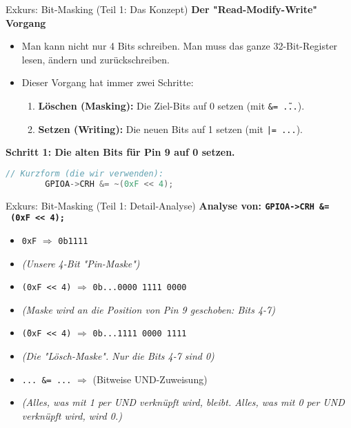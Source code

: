 \documentclass{beamer}
\begin{document}
\begin{frame}[fragile]{Exkurs: Bit-Masking (Teil 1: Das Konzept)}
	\textbf{Der "Read-Modify-Write" Vorgang}
	\begin{itemize}
		\item Man kann nicht nur 4 Bits schreiben. Man muss das ganze 32-Bit-Register lesen, ändern und zurückschreiben.
		\item Dieser Vorgang hat immer zwei Schritte:
		\begin{enumerate}
			\item \textbf{Löschen (Masking):} Die Ziel-Bits auf 0 setzen (mit \texttt{\&= \~...}).
			\item \textbf{Setzen (Writing):} Die neuen Bits auf 1 setzen (mit \texttt{|= ...}).
		\end{enumerate}
	\end{itemize}
	
	\bigskip
	\textbf{Schritt 1: Die alten Bits für Pin 9 auf 0 setzen.}
	\begin{lstlisting}[language=C, style=mystyle]
		// Kurzform (die wir verwenden):
		GPIOA->CRH &= ~(0xF << 4);
	\end{lstlisting}
\end{frame}

\begin{frame}[fragile]{Exkurs: Bit-Masking (Teil 1: Detail-Analyse)}
	\textbf{Analyse von: \texttt{GPIOA->CRH \&= ~(0xF << 4);}}
	
	\begin{itemize}
		\item \texttt{0xF} $\Rightarrow$ \texttt{0b1111}
		\item \textit{(Unsere 4-Bit "Pin-Maske")}
		
		\medskip
		\item \texttt{(0xF << 4)} $\Rightarrow$ \texttt{0b...0000 1111 0000}
		\item \textit{(Maske wird an die Position von Pin 9 geschoben: Bits 4-7)}
		
		\medskip
		\item \texttt{\~ (0xF << 4)} $\Rightarrow$ \texttt{0b...1111 0000 1111}
		\item \textit{(Die "Lösch-Maske". Nur die Bits 4-7 sind 0)}
		
		\medskip
		\item \texttt{... \&= ...} $\Rightarrow$ (Bitweise UND-Zuweisung)
		\item \textit{(Alles, was mit 1 per UND verknüpft wird, bleibt. Alles, was mit 0 per UND verknüpft wird, wird 0.)}
	\end{itemize}
\end{frame}
\end{document}
